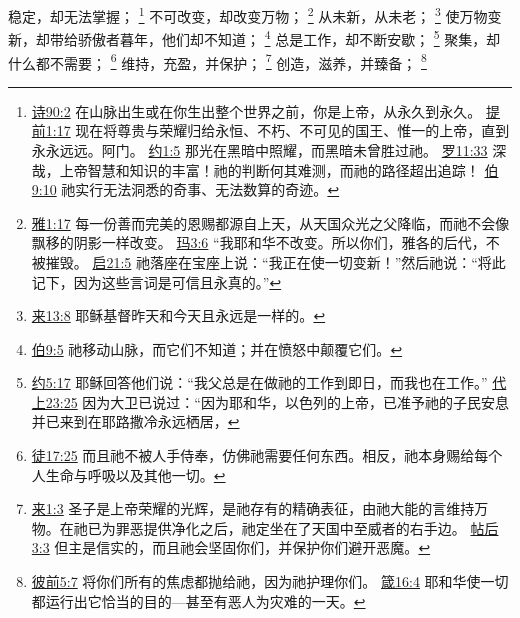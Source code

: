 \documentclass[12pt, a4paper, oneside]{ctexart}
\begin{document}
    稳定，却无法掌握；
    \footnote {
        \href{https://biblehub.com/psalms/90-2.htm}{诗90:2} 在山脉出生或在你生出整个世界之前，你是上帝，从永久到永久。
		\href{https://biblehub.com/1_timothy/1-17.htm}{提前1:17} 现在将尊贵与荣耀归给永恒、不朽、不可见的国王、惟一的上帝，直到永永远远。阿门。
        \href{https://biblehub.com/john/1-5.htm}{约1:5} 那光在黑暗中照耀，而黑暗未曾胜过祂。
		\href{https://biblehub.com/romans/11-33.htm}{罗11:33} 深哉，上帝智慧和知识的丰富！祂的判断何其难测，而祂的路径超出追踪！
        \href{https://biblehub.com/job/9-10.htm}{伯9:10} 祂实行无法洞悉的奇事、无法数算的奇迹。
	}
    不可改变，却改变万物；
    \footnote {
        \href{https://biblehub.com/james/1-17.htm}{雅1:17} 每一份善而完美的恩赐都源自上天，从天国众光之父降临，而祂不会像飘移的阴影一样改变。
		\href{https://biblehub.com/malachi/3-6.htm}{玛3:6} “我耶和华不改变。所以你们，雅各的后代，不被摧毁。
        \href{https://biblehub.com/revelation/21-5.htm}{启21:5} 祂落座在宝座上说：“我正在使一切变新！”然后祂说：“将此记下，因为这些言词是可信且永真的。”
	}
    从未新，从未老；
    \footnote {
        \href{https://biblehub.com/hebrews/13-8.htm}{来13:8} 耶稣基督昨天和今天且永远是一样的。
	}
    使万物变新，却带给骄傲者暮年，他们却不知道；
    \footnote {
        \href{https://biblehub.com/jobs/9-5.htm}{伯9:5} 祂移动山脉，而它们不知道；并在愤怒中颠覆它们。
	}
    总是工作，却不断安歇；
    \footnote {
        \href{https://biblehub.com/john/5-17.htm}{约5:17} 耶稣回答他们说：“我父总是在做祂的工作到即日，而我也在工作。”
        \href{https://biblehub.com/1_chronicles/23-25.htm}{代上23:25} 因为大卫已说过：“因为耶和华，以色列的上帝，已准予祂的子民安息并已来到在耶路撒冷永远栖居，
	}
    聚集，却什么都不需要；
	\footnote {
        \href{https://biblehub.com/acts/17-25.htm}{徒17:25} 而且祂不被人手侍奉，仿佛祂需要任何东西。相反，祂本身赐给每个人生命与呼吸以及其他一切。
	}
	维持，充盈，并保护；
    \footnote {
        \href{https://biblehub.com/hebrews/1-3.htm}{来1:3} 圣子是上帝荣耀的光辉，是祂存有的精确表征，由祂大能的言维持万物。在祂已为罪恶提供净化之后，祂定坐在了天国中至威者的右手边。
        \href{https://biblehub.com/2_thessalonians/3-3.htm}{帖后3:3} 但主是信实的，而且祂会坚固你们，并保护你们避开恶魔。
	}
    创造，滋养，并臻备；
    \footnote {
        \href{https://biblehub.com/1_peter/5-7.htm}{彼前5:7} 将你们所有的焦虑都抛给祂，因为祂护理你们。
        \href{https://biblehub.com/proverbs/16-4.htm}{箴16:4} 耶和华使一切都运行出它恰当的目的---甚至有恶人为灾难的一天。
	}
\end{document}
